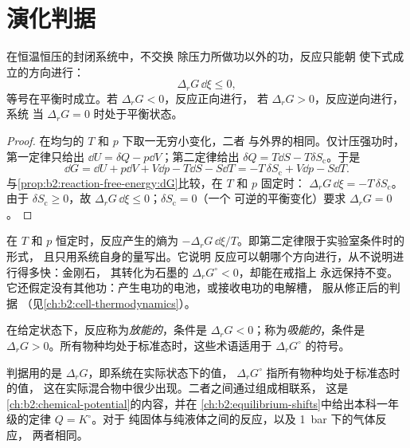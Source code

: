 \section{演化判据}

\begin{theorem}[演化判据]\label{thm:b2:reaction-free-energy:evolution}
在恒温恒压的封闭系统中，不交换
除压力所做功以外的功，反应只能朝
使下式成立的方向进行：
\[
  \Delta_r G\,\dd\xi \leq 0 ,
\]
等号在平衡时成立。若 $\Delta_r G < 0$，反应正向进行，
若 $\Delta_r G > 0$，反应逆向进行，系统
当 $\Delta_r G = 0$ 时处于平衡状态。
\end{theorem}

\begin{proof}
在均匀的 $T$ 和 $p$ 下取一无穷小变化，二者
与外界的相同。仅计压强功时，第一定律只给出 $\dd U = \delta Q
- p\dd V$；第二定律给出 $\delta Q = T\dd S - T\delta S_{\text{c}}$。于是
\[
  \dd G = \dd U + p\dd V + V\dd p - T\dd S - S\dd T = -T\,\delta
  S_{\text{c}} + V\dd p - S\dd T .
\]
与\cref{prop:b2:reaction-free-energy:dG}比较，在 $T$ 和 $p$ 固定时：
$\Delta_r G\,\dd\xi = -T\,\delta S_{\text{c}}$。由于 $\delta S_{\text{c}}
\geq 0$，故 $\Delta_r G\,\dd\xi \leq 0$；$\delta S_{\text{c}} = 0$（一个
可逆的平衡变化）要求 $\Delta_r G = 0$。
\end{proof}

\begin{remark}\label{rem:b2:reaction-free-energy:criterion}
在 $T$ 和 $p$ 恒定时，反应产生的熵为 $-\Delta_r G\,
\dd\xi/T$。即第二定律限于实验室条件时的形式，
且只用系统自身的量写出。它说明
反应可以朝哪个方向进行，从不说明进行得多快：金刚石，
其转化为石墨的 $\Delta_r G^\circ < 0$，却能在戒指上
永远保持不变。它还假定没有其他功：产生电功的电池，或接收电功的电解槽，
服从修正后的判据
（见\cref{ch:b2:cell-thermodynamics}）。
\end{remark}

\begin{definition}[放能与吸能]\label{def:b2:reaction-free-energy:exergonic}
在给定状态下，反应称为\emph{放能的}，条件是
$\Delta_r G < 0$；称为\emph{吸能的}，条件是 $\Delta_r G >
0$。所有物种均处于标准态时，这些术语适用于
$\Delta_r G^\circ$ 的符号。
\end{definition}

判据用的是 $\Delta_r G$，即系统在实际状态下的值，
$\Delta_r G^\circ$ 指所有物种均处于标准态时的值，
这在实际混合物中很少出现。二者之间通过组成相联系，
这是\cref{ch:b2:chemical-potential}的内容，并在
\cref{ch:b2:equilibrium-shifts}中给出本科一年级的定律 $Q = K^\circ$。对于
纯固体与纯液体之间的反应，以及 \qty{1}{bar} 下的气体反应，
两者相同。

